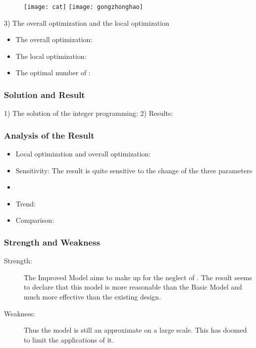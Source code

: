 \documentclass{apmcmthesis}
\begin{document}
\begin{figure}[!ht]
  \centering
  \texttt{[image: cat]}  \quad  \texttt{[image: gongzhonghao]}
  \caption{}\label{cat1}
\end{figure}



3) The overall optimization and the local optimization

\begin{itemize}
  \item The overall optimization:
  \item The local optimization:
  \item The optimal number of        :
\end{itemize}



\subsubsection{Solution and Result}
1) The solution of the integer programming:
2) Results:
\subsubsection{Analysis of the Result}
\begin{itemize}
  \item Local optimization and overall optimization:
  \item Sensitivity: The result is quite sensitive to the change of the three parameters
  \item
  \item Trend:
  \item Comparison:
\end{itemize}
\subsubsection{Strength and Weakness}

\begin{description}
  \item[Strength:] The Improved Model aims to make up for the neglect of         . The result seems to declare that this model is more reasonable than the Basic Model and much more effective than the existing design.
  \item[Weakness:] Thus the model is still an approximate on a large scale. This has doomed to limit the applications of it.
\end{description}
\end{document}
